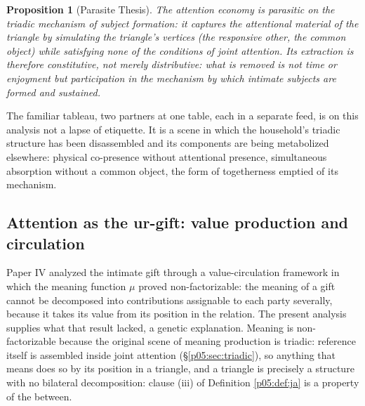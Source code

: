 \documentclass[11pt,a4paper]{article}
\theoremstyle{seriesthm}
\newtheorem{prop}{Proposition}
\begin{document}
\begin{prop}[Parasite Thesis]\label{p05:prop:parasite}
The attention economy is parasitic on the triadic mechanism of subject formation: it captures the attentional material of the triangle by simulating the triangle's vertices (the responsive other, the common object) while satisfying none of the conditions of joint attention. Its extraction is therefore constitutive, not merely distributive: what is removed is not time or enjoyment but participation in the mechanism by which intimate subjects are formed and sustained.
\end{prop}

The familiar tableau, two partners at one table, each in a separate feed, is on this analysis not a lapse of etiquette. It is a scene in which the household's triadic structure has been disassembled and its components are being metabolized elsewhere: physical co-presence without attentional presence, simultaneous absorption without a common object, the form of togetherness emptied of its mechanism.

\subsection{Attention as the ur-gift: value production and circulation}
\label{p05:sec:urgift}

Paper IV analyzed the intimate gift through a value-circulation framework in which the meaning function $\mu$ proved non-factorizable: the meaning of a gift cannot be decomposed into contributions assignable to each party severally, because it takes its value from its position in the relation. The present analysis supplies what that result lacked, a genetic explanation. Meaning is non-factorizable because the original scene of meaning production is triadic: reference itself is assembled inside joint attention (§\ref{p05:sec:triadic}), so anything that means does so by its position in a triangle, and a triangle is precisely a structure with no bilateral decomposition: clause (iii) of Definition \ref{p05:def:ja} is a property of the between.
\end{document}
